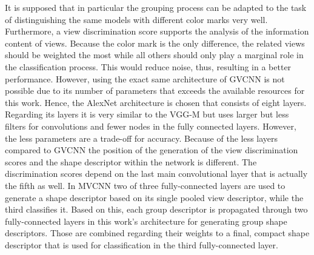 It is supposed that in particular the grouping process can be adapted to the task of distinguishing the same models with different color marks very well.
Furthermore, a view discrimination score supports the analysis of the information content of views.
Because the color mark is the only difference, the related views should be weighted the most while all others should only play a marginal role in the classification process.
This would reduce noise, thus, resulting in a better performance.
However, using the exact same architecture of GVCNN is not possible due to its number of parameters that exceeds the available resources for this work.
Hence, the AlexNet architecture \cite{Krizhevsky:2012:ICD:2999134.2999257} is chosen that consists of eight layers.
Regarding its layers it is very similar to the VGG-M but uses larger but less filters for convolutions and fewer nodes in the fully connected layers.
However, the less parameters are a trade-off for accuracy.
Because of the less layers compared to GVCNN the position of the generation of the view discrimination scores and the shape descriptor within the network is different.
The discrimination scores depend on the last main convolutional layer that is actually the fifth as well.
In MVCNN two of three fully-connected layers are used to generate a shape descriptor based on its single pooled view descriptor, while the third classifies it.
Based on this, each group descriptor is propagated through two fully-connected layers in this work's architecture for generating group shape descriptors.
Those are combined regarding their weights to a final, compact shape descriptor that is used for classification in the third fully-connected layer.

